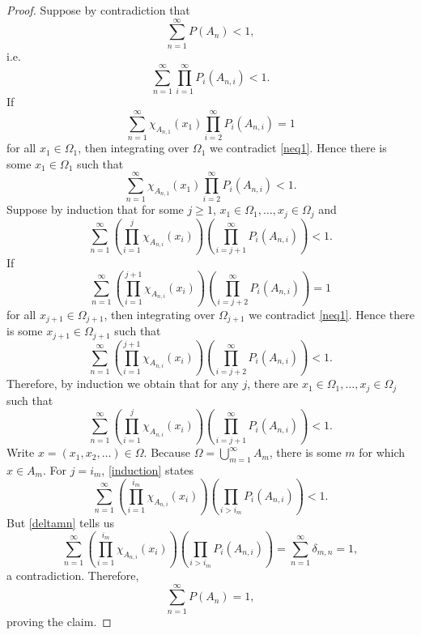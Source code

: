 \documentclass{article}
\theoremstyle{definition}
\begin{document}
\begin{proof}
Suppose by contradiction that
\[
\sum_{n=1}^\infty P(A_n) < 1,
\]
i.e.
\begin{equation}
\sum_{n=1}^\infty \prod_{i=1}^{\infty} P_i(A_{n,i})<1.
\label{neq1}
\end{equation}
If 
\[
\sum_{n=1}^\infty \chi_{A_{n,1}}(x_1) \prod_{i=2}^{\infty} P_i(A_{n,i}) = 1
\]
for all $x_1 \in \Omega_1$, then integrating over $\Omega_1$ we contradict \eqref{neq1}. Hence
there is some $x_1 \in \Omega_1$ such that
\[
\sum_{n=1}^\infty \chi_{A_{n,1}}(x_1) \prod_{i=2}^{\infty} P_i(A_{n,i}) <1.
\]
Suppose by induction that for some $j \geq 1$, $x_1 \in \Omega_1,\ldots,x_j \in \Omega_j$ and 
\[
\sum_{n=1}^\infty \left( \prod_{i=1}^j \chi_{A_{n,i}}(x_i) \right) \left(\prod_{i=j+1}^{\infty} P_i(A_{n,i})\right) <1.
\]
If
\[
\sum_{n=1}^\infty \left( \prod_{i=1}^{j+1} \chi_{A_{n,i}}(x_i) \right) \left(\prod_{i=j+2}^{\infty} P_i(A_{n,i})\right) =1
\]
for all $x_{j+1} \in \Omega_{j+1}$, then integrating over $\Omega_{j+1}$ we contradict
\eqref{neq1}. Hence there is some $x_{j+1} \in \Omega_{j+1}$ such that
\[
\sum_{n=1}^\infty \left( \prod_{i=1}^{j+1} \chi_{A_{n,i}}(x_i) \right) \left(\prod_{i=j+2}^{\infty} P_i(A_{n,i})\right) <1.
\]
Therefore, by induction we obtain that for any $j$, there are $x_1 \in \Omega_1,\ldots,x_j \in \Omega_j$ such that
\begin{equation}
\sum_{n=1}^\infty \left( \prod_{i=1}^j \chi_{A_{n,i}}(x_i) \right) \left(\prod_{i=j+1}^{\infty} P_i(A_{n,i})\right) <1.
\label{induction}
\end{equation}
Write $x=(x_1,x_2,\ldots) \in \Omega$. Because $\Omega= \bigcup_{m=1}^\infty A_m$, there is some $m$ for which
$x \in A_m$. For $j=i_m$, \eqref{induction} states
\[
\sum_{n=1}^\infty \left( \prod_{i=1}^{i_m} \chi_{A_{n,i}}(x_i) \right) \left(\prod_{i>i_m} P_i(A_{n,i})\right) <1.
\]
But \eqref{deltamn} tells us
\[
\sum_{n=1}^\infty \left( \prod_{i=1}^{i_m} \chi_{A_{n,i}}(x_i) \right)  \left( \prod_{i>i_m} P_i(A_{n,i}) \right)=
\sum_{n=1}^\infty \delta_{m,n} =1,
\]
a contradiction. Therefore, 
\[
\sum_{n=1}^\infty P(A_n) =1,
\]
proving the claim.
\end{proof}
\end{document}

